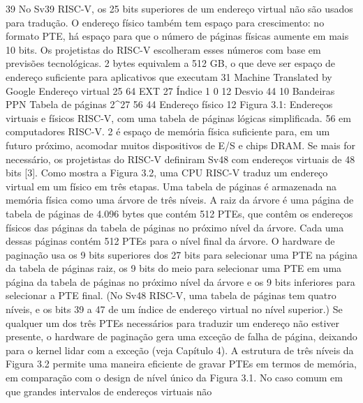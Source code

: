  39
 No  Sv39  RISC-V,  os  25  bits  superiores  de  um  endereço  virtual  não  são  usados  para  tradução.  O  endereço  físico  
também  tem  espaço  para  crescimento:  no  formato  PTE,  há  espaço  para  que  o  número  de  páginas  físicas  aumente  em  
mais  10  bits.  Os  projetistas  do  RISC-V  escolheram  esses  números  com  base  em  previsões  tecnológicas.  2  bytes  equivalem  
a  512  GB,  o  que  deve  ser  espaço  de  endereço  suficiente  para  aplicativos  que  executam
 31
Machine Translated by Google
 Endereço  virtual
 25
 64
 EXT
 27
 Índice
 1
 0
 12
 Desvio
 44
 10
 Bandeiras  PPN
 Tabela  de  páginas
 2^27
 56
 44
 Endereço  físico
 12
 Figura  3.1:  Endereços  virtuais  e  físicos  RISC-V,  com  uma  tabela  de  páginas  lógicas  simplificada.
 56
 em  computadores  RISC-V.  2  é  espaço  de  memória  física  suficiente  para,  em  um  futuro  próximo,  acomodar  muitos  dispositivos  
de  E/S  e  chips  DRAM.  Se  mais  for  necessário,  os  projetistas  do  RISC-V  definiram  Sv48  com  endereços  virtuais  de  48  bits  [3].
 Como  mostra  a  Figura  3.2,  uma  CPU  RISC-V  traduz  um  endereço  virtual  em  um  físico  em  três  etapas.
 Uma  tabela  de  páginas  é  armazenada  na  memória  física  como  uma  árvore  de  três  níveis.  A  raiz  da  árvore  é  uma  página  de  
tabela  de  páginas  de  4.096  bytes  que  contém  512  PTEs,  que  contêm  os  endereços  físicos  das  páginas  da  tabela  de  páginas  no  
próximo  nível  da  árvore.  Cada  uma  dessas  páginas  contém  512  PTEs  para  o  nível  final  da  árvore.
 O  hardware  de  paginação  usa  os  9  bits  superiores  dos  27  bits  para  selecionar  uma  PTE  na  página  da  tabela  de  páginas  raiz,  os  
9  bits  do  meio  para  selecionar  uma  PTE  em  uma  página  da  tabela  de  páginas  no  próximo  nível  da  árvore  e  os  9  bits  inferiores  
para  selecionar  a  PTE  final.  (No  Sv48  RISC-V,  uma  tabela  de  páginas  tem  quatro  níveis,  e  os  bits  39  a  47  de  um  índice  de  
endereço  virtual  no  nível  superior.)
 Se  qualquer  um  dos  três  PTEs  necessários  para  traduzir  um  endereço  não  estiver  presente,  o  hardware  de  paginação
 gera  uma  exceção  de  falha  de  página,  deixando  para  o  kernel  lidar  com  a  exceção  (veja  Capítulo  4).
 A  estrutura  de  três  níveis  da  Figura  3.2  permite  uma  maneira  eficiente  de  gravar  PTEs  em  termos  de  memória,  em  
comparação  com  o  design  de  nível  único  da  Figura  3.1.  No  caso  comum  em  que  grandes  intervalos  de  endereços  virtuais  não  
